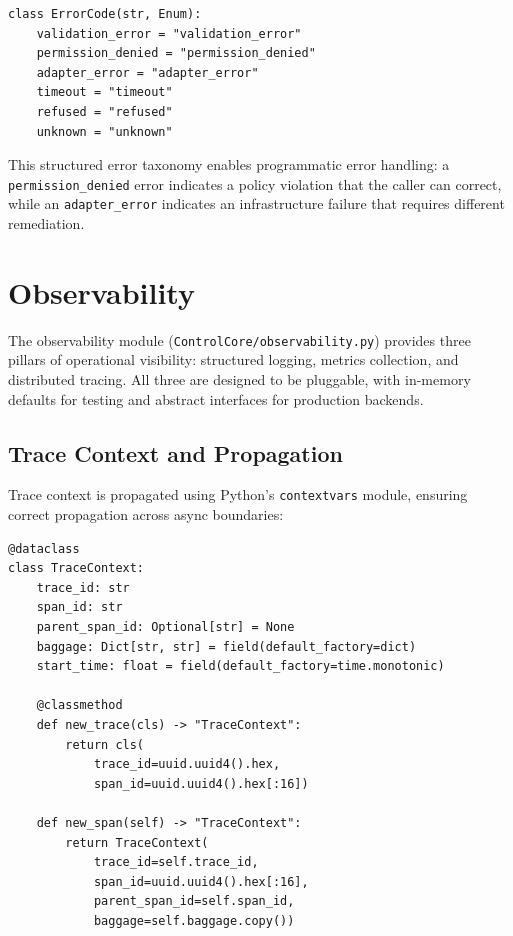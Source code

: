 \documentclass[11pt,a4paper]{article}
\theoremstyle{plain}
\theoremstyle{definition}
\begin{document}
\begin{lstlisting}[style=pythonstyle, caption={ErrorCode enumeration from \texttt{schemas.py}}]
class ErrorCode(str, Enum):
    validation_error = "validation_error"
    permission_denied = "permission_denied"
    adapter_error = "adapter_error"
    timeout = "timeout"
    refused = "refused"
    unknown = "unknown"
\end{lstlisting}

This structured error taxonomy enables programmatic error handling: a
\texttt{permission\_denied} error indicates a policy violation that the caller
can correct, while an \texttt{adapter\_error} indicates an infrastructure
failure that requires different remediation.

\section{Observability}
\label{sec:observability}

The observability module (\texttt{ControlCore/observability.py}) provides three
pillars of operational visibility: structured logging, metrics collection, and
distributed tracing. All three are designed to be pluggable, with in-memory
defaults for testing and abstract interfaces for production backends.

\subsection{Trace Context and Propagation}

Trace context is propagated using Python's \texttt{contextvars} module,
ensuring correct propagation across async boundaries:

\begin{lstlisting}[style=pythonstyle, caption={TraceContext from \texttt{observability.py}}]
@dataclass
class TraceContext:
    trace_id: str
    span_id: str
    parent_span_id: Optional[str] = None
    baggage: Dict[str, str] = field(default_factory=dict)
    start_time: float = field(default_factory=time.monotonic)

    @classmethod
    def new_trace(cls) -> "TraceContext":
        return cls(
            trace_id=uuid.uuid4().hex,
            span_id=uuid.uuid4().hex[:16])

    def new_span(self) -> "TraceContext":
        return TraceContext(
            trace_id=self.trace_id,
            span_id=uuid.uuid4().hex[:16],
            parent_span_id=self.span_id,
            baggage=self.baggage.copy())
\end{lstlisting}
\end{document}
